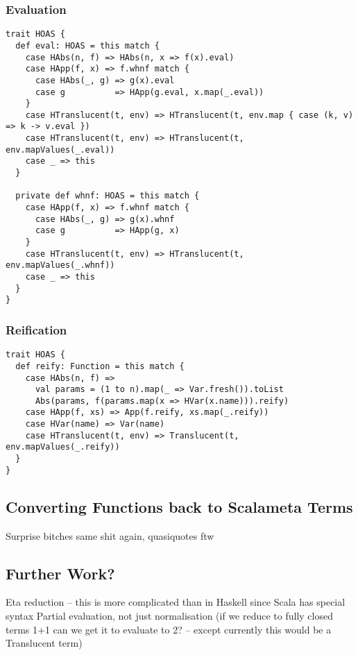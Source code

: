 \documentclass[../../main.tex]{subfiles}
\begin{document}
\subsubsection{Evaluation}
\begin{verbatim}
trait HOAS {
  def eval: HOAS = this match {
    case HAbs(n, f) => HAbs(n, x => f(x).eval)
    case HApp(f, x) => f.whnf match {
      case HAbs(_, g) => g(x).eval
      case g          => HApp(g.eval, x.map(_.eval))
    }
    case HTranslucent(t, env) => HTranslucent(t, env.map { case (k, v) => k -> v.eval })
    case HTranslucent(t, env) => HTranslucent(t, env.mapValues(_.eval))
    case _ => this
  }

  private def whnf: HOAS = this match {
    case HApp(f, x) => f.whnf match {
      case HAbs(_, g) => g(x).whnf
      case g          => HApp(g, x)
    }
    case HTranslucent(t, env) => HTranslucent(t, env.mapValues(_.whnf))
    case _ => this
  }
}
\end{verbatim}

\subsubsection{Reification}
\begin{verbatim}
trait HOAS {  
  def reify: Function = this match {
    case HAbs(n, f) =>
      val params = (1 to n).map(_ => Var.fresh()).toList
      Abs(params, f(params.map(x => HVar(x.name))).reify)
    case HApp(f, xs) => App(f.reify, xs.map(_.reify))
    case HVar(name) => Var(name)
    case HTranslucent(t, env) => Translucent(t, env.mapValues(_.reify))
  }
}
\end{verbatim}

\subsection{Converting Functions back to Scalameta Terms}
Surprise bitches same shit again, quasiquotes ftw

\subsection{Further Work?}
Eta reduction -- this is more complicated than in Haskell since Scala has special syntax %
Partial evaluation, not just normalisation (if we reduce to fully closed terms 1+1 can we get it to evaluate to 2? -- except currently this would be a Translucent term)
\end{document}
